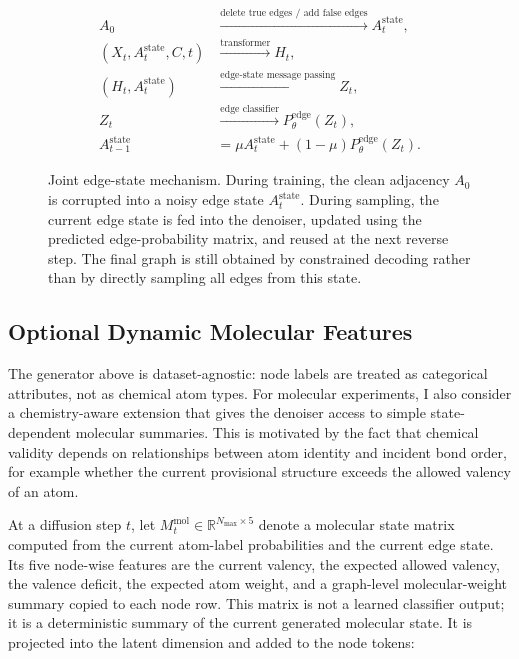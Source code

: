 \begin{figure}[H]
    \centering
    \small
    \[
    \begin{aligned}
    A_0
    &\xrightarrow{\text{delete true edges / add false edges}}
    A_t^{\mathrm{state}},
    \\
    (X_t,A_t^{\mathrm{state}},C,t)
    &\xrightarrow{\text{transformer}}
    H_t,
    \\
    (H_t,A_t^{\mathrm{state}})
    &\xrightarrow{\text{edge-state message passing}}
    Z_t,
    \\
    Z_t
    &\xrightarrow{\text{edge classifier}}
    P_\theta^{\mathrm{edge}}(Z_t),
    \\
    A_{t-1}^{\mathrm{state}}
    &=
    \mu A_t^{\mathrm{state}}
    +(1-\mu)P_\theta^{\mathrm{edge}}(Z_t).
    \end{aligned}
    \]
    \caption{
    Joint edge-state mechanism. During training, the clean adjacency \(A_0\) is
    corrupted into a noisy edge state \(A_t^{\mathrm{state}}\). During sampling,
    the current edge state is fed into the denoiser, updated using the predicted
    edge-probability matrix, and reused at the next reverse step. The final
    graph is still obtained by constrained decoding rather than by directly
    sampling all edges from this state.
    }
    \label{fig:generator:joint-edge-state}
\end{figure}

\subsection{Optional Dynamic Molecular Features}
\label{sec:generator:dynamic-molecular}

The generator above is dataset-agnostic: node labels are treated as categorical
attributes, not as chemical atom types. For molecular experiments, I also
consider a chemistry-aware extension that gives the denoiser access to simple
state-dependent molecular summaries. This is motivated by the fact that
chemical validity depends on relationships between atom identity and incident
bond order, for example whether the current provisional structure exceeds the
allowed valency of an atom.

At a diffusion step \(t\), let \(M_t^{\mathrm{mol}}\in
\mathbb{R}^{N_{\max}\times 5}\) denote a molecular state matrix computed from
the current atom-label probabilities and the current edge state. Its five
node-wise features are the current valency, the expected allowed valency, the
valence deficit, the expected atom weight, and a graph-level molecular-weight
summary copied to each node row. This matrix is not a learned classifier
output; it is a deterministic summary of the current generated molecular state.
It is projected into the latent dimension and added to the node tokens:

